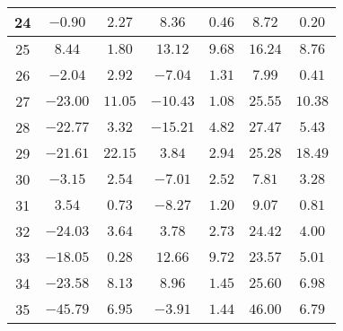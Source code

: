 \begin{table}[H]
\begin{tabular}{|c|c|c|c|c|c|c|}
                        24  &   $-0.90$    &  $2.27$   &  $8.36$    &   $0.46$   &  $8.72$   &  $0.20$  \\ \hline
                        25  &   $8.44$     &  $1.80$   &  $13.12$   &   $9.68$   &  $16.24$  &  $8.76$  \\ \hline
                        26  &   $-2.04$    &  $2.92$   &  $-7.04$   &   $1.31$   &  $7.99$   &  $0.41$  \\ \hline
                        27  &   $-23.00$   &  $11.05$  &  $-10.43$  &   $1.08$   &  $25.55$  &  $10.38$ \\ \hline
                        28  &   $-22.77$   &  $3.32$   &  $-15.21$  &   $4.82$   &  $27.47$  &  $5.43$  \\ \hline
                        29  &   $-21.61$   &  $22.15$  &  $3.84$    &   $2.94$   &  $25.28$  &  $18.49$ \\ \hline
                        30  &   $-3.15$    &  $2.54$   &  $-7.01$   &   $2.52$   &  $7.81$   &  $3.28$  \\ \hline
                        31  &   $3.54$     &  $0.73$   &  $-8.27$   &   $1.20$   &  $9.07$   &  $0.81$  \\ \hline
                        32  &   $-24.03$   &  $3.64$   &  $3.78$    &   $2.73$   &  $24.42$  &  $4.00$  \\ \hline
                        33  &   $-18.05$   &  $0.28$   &  $12.66$   &   $9.72$   &  $23.57$  &  $5.01$  \\ \hline
                        34  &   $-23.58$   &  $8.13$   &  $8.96$    &   $1.45$   &  $25.60$  &  $6.98$  \\ \hline
                        35  &   $-45.79$   &  $6.95$   &  $-3.91$   &   $1.44$   &  $46.00$  &  $6.79$  \\ \hline
        \end{tabular}
    \label{tab:media_fisica_6_espiral}
\end{table}